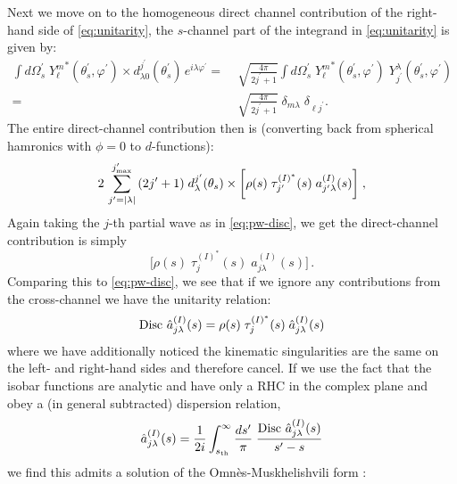 Next we move on to the homogeneous direct channel contribution of the right-hand side of \cref{eq:unitarity}, the \(s\)-channel part of the integrand in \cref{eq:unitarity} is given by:
  \begin{align}
      \label{eq:direct-channel-angle}
     \int d\Omega_s^\prime \; {Y^m_\ell}^*(\theta_s^\prime, \varphi^\prime) \times d_{\lambda0}^{j^\prime}(\theta_s^\prime) \, e^{i\lambda \varphi^\prime} =&
     \;
     \sqrt{\frac{4\pi}{2j^\prime+1}}
      \int d\Omega_s^\prime \; {Y^m_\ell}^*(\theta_s^\prime, \varphi^\prime) \;  Y^\lambda_{j^\prime}(\theta_s^\prime, \varphi^\prime) \nonumber \\
    =& \;  \sqrt{\frac{4\pi}{2j^\prime+1}} \;  \delta_{m\lambda} \; \delta_{\ell j^\prime}.
  \end{align}
The entire direct-channel contribution then is (converting back from spherical hamronics with \(\phi = 0\) to \(d\)-functions):
  \begin{align}
     2 \,  \sum_{{j^\prime}=|\lambda|}^{j^\prime_\text{max}}  \,
       (2{j^\prime} +1) \; d_\lambda^{j^\prime}(\theta_s)
        \times
        \bigg[\rho(s) \; \tau^{(I)^*}_{j^\prime}(s) \; a^{(I)}_{{j^\prime}\lambda}(s) \bigg ]
        \; ,
  \end{align}
Again taking the \(j\)-th partial wave as in \cref{eq:pw-disc}, we get the direct-channel contribution is simply
  \begin{equation}
    \label{eq:pw-direct}
    \bigg[
    \rho(s) \; {\tau}^{(I)^*}_j(s) \; a^{(I)}_{j\lambda}(s)
    \bigg] \, .
  \end{equation}
Comparing this to \cref{eq:pw-disc}, we see that if we ignore any contributions from the cross-channel we have the unitarity relation:
  \begin{equation}
    \label{omnes-unitarity}
    \text{Disc } \hat{a}^{(I)}_{j\lambda}(s) = \rho(s) \; {\tau}^{(I)^*}_j(s) \; \hat{a}_{j\lambda}^{(I)}(s)
  \end{equation}
where we have additionally noticed the kinematic singularities are the same on the left- and right-hand sides and therefore cancel. If we use the fact that the isobar functions are analytic and have only a RHC in the complex plane and obey a (in general subtracted) dispersion relation,
  \begin{equation}
    \label{dispersion}
    \hat{a}_{j\lambda}^{(I)}(s) = \frac{1}{2i} \int_{s_\text{th}}^\infty \frac{ds^\prime}{\pi}
    \; \frac{
    \text{Disc } \hat{a}_{j\lambda}^{(I)}(s)
    }{
    s^\prime - s
    }
  \end{equation}
we find this admits a solution of the Omn\`{e}s-Muskhelishvili form \cite{Omnes1958,Kamal1979,1953sie..book.....M}:
